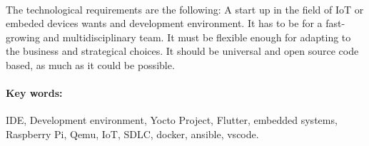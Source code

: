 \paragraph{} The technological requirements are the following: A start up in the field
of IoT or embeded devices wants and development environment. It has to be for a fast-growing
and multidisciplinary team. It must be flexible enough for adapting to the business
and strategical choices. It should be universal and open source code based, as much as
it could be possible.

\paragraph{Key words:} IDE, Development environment, Yocto Project, Flutter, embedded
systems, Raspberry Pi, Qemu, IoT, SDLC, docker, ansible, vscode.


